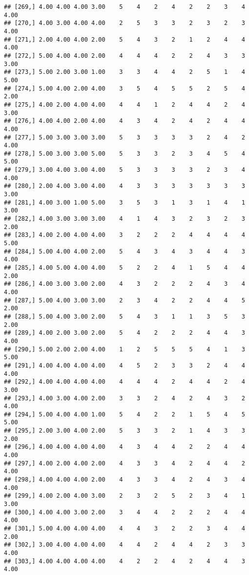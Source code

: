 \documentclass[]{article}
\begin{document}
\begin{verbatim}
## [269,] 4.00 4.00 4.00 3.00    5    4    2    4    2    2    3    4 4.00
## [270,] 4.00 3.00 4.00 4.00    2    5    3    3    2    3    2    3 4.00
## [271,] 2.00 4.00 4.00 2.00    5    4    3    2    1    2    4    4 4.00
## [272,] 5.00 4.00 4.00 2.00    4    4    4    2    2    4    3    3 3.00
## [273,] 5.00 2.00 3.00 1.00    3    3    4    4    2    5    1    4 5.00
## [274,] 5.00 4.00 2.00 4.00    3    5    4    5    5    2    5    4 2.00
## [275,] 4.00 2.00 4.00 4.00    4    4    1    2    4    4    2    4 3.00
## [276,] 4.00 4.00 2.00 4.00    4    3    4    2    4    2    4    4 4.00
## [277,] 5.00 3.00 3.00 3.00    5    3    3    3    3    2    4    2 4.00
## [278,] 5.00 3.00 3.00 5.00    5    3    3    2    3    4    5    4 5.00
## [279,] 3.00 4.00 3.00 4.00    5    3    3    3    3    2    3    4 4.00
## [280,] 2.00 4.00 3.00 4.00    4    3    3    3    3    3    3    3 3.00
## [281,] 4.00 3.00 1.00 5.00    3    5    3    1    3    1    4    1 3.00
## [282,] 4.00 3.00 3.00 3.00    4    1    4    3    2    3    2    3 2.00
## [283,] 4.00 2.00 4.00 4.00    3    2    2    2    4    4    4    4 5.00
## [284,] 5.00 4.00 4.00 2.00    5    4    3    4    3    4    4    3 4.00
## [285,] 4.00 5.00 4.00 4.00    5    2    2    4    1    5    4    4 2.00
## [286,] 4.00 3.00 3.00 2.00    4    3    2    2    2    4    3    4 4.00
## [287,] 5.00 4.00 3.00 3.00    2    3    4    2    2    4    4    5 2.00
## [288,] 5.00 4.00 3.00 2.00    5    4    3    1    1    3    5    3 2.00
## [289,] 4.00 2.00 3.00 2.00    5    4    2    2    2    4    4    3 4.00
## [290,] 5.00 2.00 2.00 4.00    1    2    5    5    5    4    1    3 5.00
## [291,] 4.00 4.00 4.00 4.00    4    5    2    3    3    2    4    4 4.00
## [292,] 4.00 4.00 4.00 4.00    4    4    4    2    4    4    2    4 3.00
## [293,] 4.00 3.00 4.00 2.00    3    3    2    4    2    4    3    2 4.00
## [294,] 5.00 4.00 4.00 1.00    5    4    2    2    1    5    4    5 5.00
## [295,] 2.00 3.00 4.00 2.00    5    3    3    2    1    4    3    3 2.00
## [296,] 4.00 4.00 4.00 4.00    4    3    4    4    2    2    4    4 4.00
## [297,] 4.00 2.00 4.00 2.00    4    3    3    4    2    4    4    2 4.00
## [298,] 4.00 4.00 4.00 2.00    4    3    3    4    2    4    3    4 4.00
## [299,] 4.00 2.00 4.00 3.00    2    3    2    5    2    3    4    1 3.00
## [300,] 4.00 4.00 3.00 2.00    3    4    4    2    2    2    4    4 4.00
## [301,] 5.00 4.00 4.00 4.00    4    4    3    2    2    3    4    4 2.00
## [302,] 3.00 4.00 4.00 4.00    4    4    2    4    4    2    3    3 4.00
## [303,] 4.00 4.00 4.00 4.00    4    2    2    4    2    4    4    3 4.00

\end{verbatim}
\end{document}
